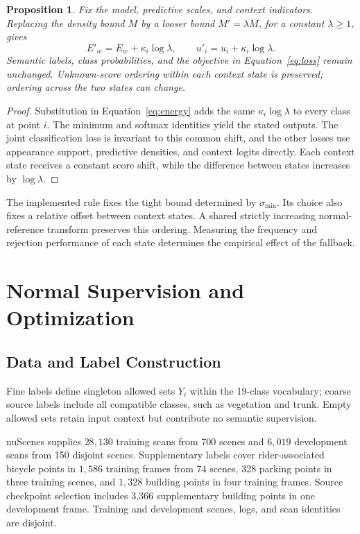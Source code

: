\documentclass{article}
\newtheorem{proposition}{Proposition}
\begin{document}
\begin{proposition}
Fix the model, predictive scales, and context indicators. Replacing the density bound $M$ by a looser bound $M'=\lambda M$, for a constant $\lambda\geq1$, gives
\begin{equation}
 E'_{ic}=E_{ic}+\kappa_i\log\lambda,\qquad
 u'_i=u_i+\kappa_i\log\lambda.
 \label{eq:bound-shift}
\end{equation}
Semantic labels, class probabilities, and the objective in Equation~\eqref{eq:loss} remain unchanged. Unknown-score ordering within each context state is preserved; ordering across the two states can change.
\end{proposition}
\begin{proof}
Substitution in Equation~\eqref{eq:energy} adds the same $\kappa_i\log\lambda$ to every class at point $i$. The minimum and softmax identities yield the stated outputs. The joint classification loss is invariant to this common shift, and the other losses use appearance support, predictive densities, and context logits directly. Each context state receives a constant score shift, while the difference between states increases by $\log\lambda$.
\end{proof}
The implemented rule fixes the tight bound determined by $\sigma_{\min}$. Its choice also fixes a relative offset between context states. A shared strictly increasing normal-reference transform preserves this ordering. Measuring the frequency and rejection performance of each state determines the empirical effect of the fallback.

\section{Normal Supervision and Optimization}
\label{app:training}
\subsection{Data and Label Construction}
Fine labels define singleton allowed sets $Y_i$ within the 19-class vocabulary; coarse source labels include all compatible classes, such as vegetation and trunk. Empty allowed sets retain input context but contribute no semantic supervision.

nuScenes supplies $28{,}130$ training scans from 700 scenes and $6{,}019$ development scans from 150 disjoint scenes. Supplementary labels cover rider-associated bicycle points in $1{,}586$ training frames from 74 scenes, 328 parking points in three training scenes, and $1{,}328$ building points in four training frames. Source checkpoint selection includes 3,366 supplementary building points in one development frame. Training and development scenes, logs, and scan identities are disjoint.
\end{document}

